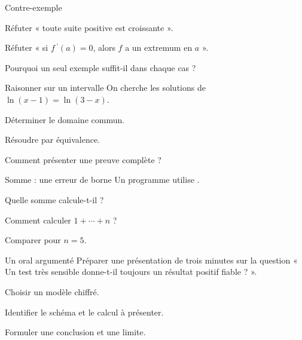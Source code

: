 \begingroup\renewcommand{\otBesoinPlace}[1]{}\begin{minipage}{\linewidth}
\begin{exercice}[3]{Contre-exemple}

\begin{questions}
\item Réfuter « toute suite positive est croissante ».
\item Réfuter « si $f\,\!^{\prime}(a)=0$, alors $f$ a un extremum en $a$ ».
\item Pourquoi un seul exemple suffit-il dans chaque cas ?
\end{questions}
\end{exercice}
\begin{exercice}[3]{Raisonner sur un intervalle}
On cherche les solutions de $\ln(x-1)=\ln(3-x)$.
\begin{questions}
\item Déterminer le domaine commun.
\item Résoudre par équivalence.
\item Comment présenter une preuve complète ?
\end{questions}
\end{exercice}
\begin{exercice}[3]{Somme : une erreur de borne}
Un programme utilise .
\begin{questions}
\item Quelle somme calcule-t-il ?
\item Comment calculer $1+\cdots+n$ ?
\item Comparer pour $n=5$.
\end{questions}
\end{exercice}
\begin{exercice}[3]{Un oral argumenté}
Préparer une présentation de trois minutes sur la question « Un test très sensible donne-t-il toujours un résultat positif fiable ? ».
\begin{questions}
\item Choisir un modèle chiffré.
\item Identifier le schéma et le calcul à présenter.
\item Formuler une conclusion et une limite.
\end{questions}
\end{exercice}
\end{minipage}\endgroup
